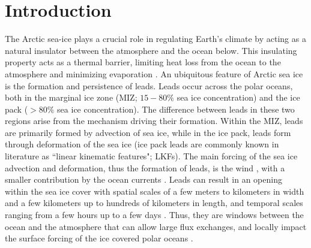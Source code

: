 \documentclass[lineno,sn-basic]{sn-jnl}%
\begin{document}


\maketitle

\section{Introduction}\label{sec1}

The Arctic sea-ice plays a crucial role in regulating Earth's climate by acting as a natural insulator between the atmosphere and the ocean below. This insulating property acts as a thermal barrier, limiting heat loss from the ocean to the atmosphere and minimizing evaporation \citep{Wettlaufer_insulator_1997, Untersteiner_ice_insulator_1961}. An ubiquitous feature of Arctic sea ice is the formation and persistence of leads. Leads occur across the polar oceans, both in the marginal ice zone (MIZ; $15-80\%$ sea ice concentration) and the ice pack ($>80\%$ sea ice concentration). The difference between leads in these two regions arise from the mechanism driving their formation. Within the MIZ, leads are primarily formed by advection of sea ice, while in the ice pack, leads form through deformation of the sea ice (ice pack leads are commonly known in literature as ``linear kinematic features"; LKFs). 
The main forcing of the sea ice advection and deformation, thus the formation of leads, is the wind \citep{Linow_lkf_2017, Hutter_scaling_lkf_2018}, with a smaller contribution by the ocean currents \citep{Willmes_leads_currents_2023}.
Leads can result in an opening within the sea ice cover \citep{Rampal_nextsim_2016, Hutchings_model_lkf_2005, Richter_pack_stress_2002} with spatial scales of a few meters to kilometers in width and a few kilometers up to hundreds of kilometers in length, and temporal scales ranging from a few hours up to a few days \citep{Linow_lkf_2017, Wernecke_Lead_2015, Tschudi_obs_leads_1998}. Thus, they are windows between the ocean and the atmosphere that can allow large flux exchanges, and locally impact the surface forcing of the ice covered polar oceans \citep{Lupkes_leads_2008}.
\end{document}
